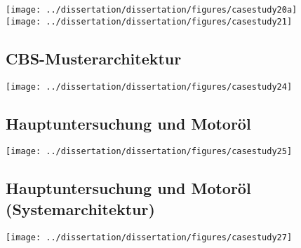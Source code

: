 	\begin{frame}{\insertsectionhead}{\insertsubsectionhead}
		\hfil\texttt{[image: ../dissertation/dissertation/figures/casestudy20a]}\hfil\\[.1\textheight]
		\hfil\texttt{[image: ../dissertation/dissertation/figures/casestudy21]}\hfil
	\end{frame}

	\subsection{CBS-Musterarchitektur}

	\begin{frame}{\insertsectionhead}{\insertsubsectionhead}
		\hfil\texttt{[image: ../dissertation/dissertation/figures/casestudy24]}\hfil
	\end{frame}

	\subsection{Hauptuntersuchung und Motoröl}

	\begin{frame}{\insertsectionhead}{\insertsubsectionhead}
		\hfil\texttt{[image: ../dissertation/dissertation/figures/casestudy25]}\hfil
	\end{frame}

	\subsection{Hauptuntersuchung und Motoröl (Systemarchitektur)}

	\begin{frame}{\insertsectionhead}{\insertsubsectionhead}
		\hfil\texttt{[image: ../dissertation/dissertation/figures/casestudy27]}\hfil
	\end{frame}

	\setcounter{framenumber}{\value{finalframe}}



